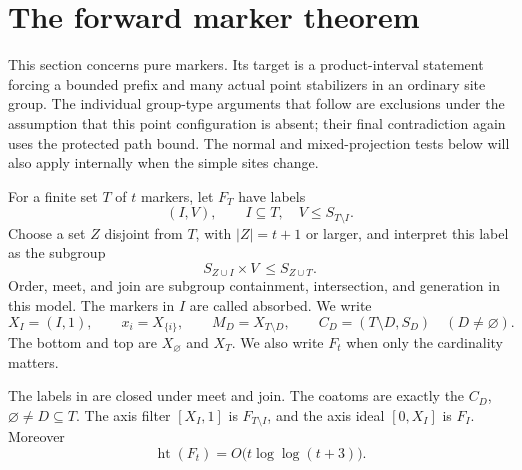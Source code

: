 \section{The forward marker theorem}\label{sec:forward}

This section concerns pure markers.  Its target is a product-interval
statement forcing a bounded prefix and many actual point stabilizers
in an ordinary site group.  The individual group-type arguments that
follow are exclusions under the assumption that this point configuration
is absent; their final contradiction again uses the protected path
bound.  The normal and mixed-projection tests below will also apply
internally when the simple sites change.

\begin{definition}\label{r:pure-markers}
For a finite set $T$ of $t$ markers, let $F_T$ have labels
\[
 (I,V),\qquad I\subseteq T,\quad V\le S_{T\setminus I}.
\]
Choose a set $Z$ disjoint from $T$, with $|Z|=t+1$ or larger, and
interpret this label as the subgroup
\[
 S_{Z\cup I}\times V\ \le S_{Z\cup T}.
\]
Order, meet, and join are subgroup containment, intersection, and
generation in this model.  The markers in $I$ are called absorbed.
We write
\[
 X_I=(I,1),\qquad x_i=X_{\{i\}},\qquad
 M_D=X_{T\setminus D},\qquad
 C_D=(T\setminus D,S_D)\quad(D\ne\varnothing).
\]
The bottom and top are $X_\varnothing$ and $X_T$.
We also write $F_t$ when only the cardinality matters.
\end{definition}

\begin{lemma}\label{r:marker-elementary}
The labels in  are closed under meet and join.
The coatoms are exactly the $C_D$, $\varnothing\ne D\subseteq T$.
The axis filter $[X_I,1]$ is $F_{T\setminus I}$, and the axis ideal
$[0,X_I]$ is $F_I$.  Moreover
\[
 \operatorname{ht}(F_t)=O\bigl(t\log\log(t+3)\bigr).
\]
\end{lemma}

